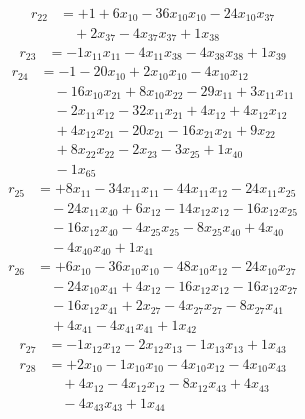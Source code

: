 \[\begin{aligned}
r_{22} &= + 1 + 6 x_{10} - 36 x_{10} x_{10} - 24 x_{10} x_{37} \\
 &\quad + 2 x_{37} - 4 x_{37} x_{37} + 1 x_{38}
\end{aligned}\]
\[\begin{aligned}
r_{23} &= - 1 x_{11} x_{11} - 4 x_{11} x_{38} - 4 x_{38} x_{38} + 1 x_{39}
\end{aligned}\]
\[\begin{aligned}
r_{24} &= - 1 - 20 x_{10} + 2 x_{10} x_{10} - 4 x_{10} x_{12} \\
 &\quad - 16 x_{10} x_{21} + 8 x_{10} x_{22} - 29 x_{11} + 3 x_{11} x_{11} \\
 &\quad - 2 x_{11} x_{12} - 32 x_{11} x_{21} + 4 x_{12} + 4 x_{12} x_{12} \\
 &\quad + 4 x_{12} x_{21} - 20 x_{21} - 16 x_{21} x_{21} + 9 x_{22} \\
 &\quad + 8 x_{22} x_{22} - 2 x_{23} - 3 x_{25} + 1 x_{40} \\
 &\quad - 1 x_{65}
\end{aligned}\]
\[\begin{aligned}
r_{25} &= + 8 x_{11} - 34 x_{11} x_{11} - 44 x_{11} x_{12} - 24 x_{11} x_{25} \\
 &\quad - 24 x_{11} x_{40} + 6 x_{12} - 14 x_{12} x_{12} - 16 x_{12} x_{25} \\
 &\quad - 16 x_{12} x_{40} - 4 x_{25} x_{25} - 8 x_{25} x_{40} + 4 x_{40} \\
 &\quad - 4 x_{40} x_{40} + 1 x_{41}
\end{aligned}\]
\[\begin{aligned}
r_{26} &= + 6 x_{10} - 36 x_{10} x_{10} - 48 x_{10} x_{12} - 24 x_{10} x_{27} \\
 &\quad - 24 x_{10} x_{41} + 4 x_{12} - 16 x_{12} x_{12} - 16 x_{12} x_{27} \\
 &\quad - 16 x_{12} x_{41} + 2 x_{27} - 4 x_{27} x_{27} - 8 x_{27} x_{41} \\
 &\quad + 4 x_{41} - 4 x_{41} x_{41} + 1 x_{42}
\end{aligned}\]
\[\begin{aligned}
r_{27} &= - 1 x_{12} x_{12} - 2 x_{12} x_{13} - 1 x_{13} x_{13} + 1 x_{43}
\end{aligned}\]
\[\begin{aligned}
r_{28} &= + 2 x_{10} - 1 x_{10} x_{10} - 4 x_{10} x_{12} - 4 x_{10} x_{43} \\
 &\quad + 4 x_{12} - 4 x_{12} x_{12} - 8 x_{12} x_{43} + 4 x_{43} \\
 &\quad - 4 x_{43} x_{43} + 1 x_{44}
\end{aligned}\]

